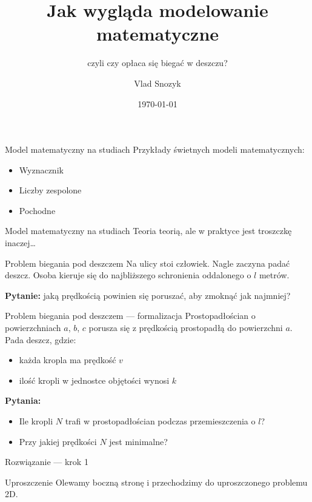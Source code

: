 \documentclass{beamer}
\title{Jak wygląda modelowanie matematyczne}
\subtitle{czyli czy opłaca się biegać w deszczu?}
\author{Vlad Snozyk}
\institute{Wydział Matematyki i Informatyki UJ}
\date{\today}
\begin{document}
\begin{frame}
  \titlepage
\end{frame}

\begin{frame}{Model matematyczny na studiach}
  Przykłady świetnych modeli matematycznych:
  \begin{itemize}
    \item Wyznacznik
    \item Liczby zespolone
    \item Pochodne
  \end{itemize}
\end{frame}

\begin{frame}{Model matematyczny na studiach}
  Teoria teorią, ale w praktyce jest troszczkę inaczej\ldots
\end{frame}

\begin{frame}{Problem biegania pod deszczem}
  Na ulicy stoi człowiek. Nagle zaczyna padać deszcz. Osoba kieruje się do
  najbliższego schronienia oddalonego o $l$ metrów.

  \vspace{0.5cm}
  \textbf{Pytanie:} jaką prędkością powinien się poruszać, aby zmoknąć jak najmniej?
\end{frame}

\begin{frame}{Problem biegania pod deszczem — formalizacja}
  Prostopadłościan o powierzchniach $a$, $b$, $c$ porusza się z prędkością
  prostopadłą do powierzchni $a$. Pada deszcz, gdzie:
  \begin{itemize}
    \item każda kropla ma prędkość $v$
    \item ilość kropli w jednostce objętości wynosi $k$
  \end{itemize}

  \vspace{0.4cm}
  \textbf{Pytania:}
  \begin{itemize}
    \item Ile kropli $N$ trafi w prostopadłościan podczas przemieszczenia o $l$?
    \item Przy jakiej prędkości $N$ jest minimalne?
  \end{itemize}
\end{frame}

\begin{frame}{Rozwiązanie — krok 1}
  \begin{block}{Uproszczenie}
    Olewamy boczną stronę i przechodzimy do uproszczonego problemu 2D.
  \end{block}
\end{frame}
\end{document}
